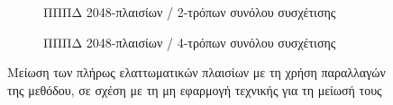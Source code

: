 \begin{figure}[!t]
    \centering
    \begin{subfigure}[t]{\textwidth}
        \centering
        \caption{ΠΠΠΔ 2048-πλαισίων / 2-τρόπων συνόλου συσχέτισης}
        \label{fig:chap5_btb_ffsets_2048_2way}
    \end{subfigure}
    
    \begin{subfigure}[t]{\textwidth}
        \centering
        \caption{ΠΠΠΔ 2048-πλαισίων / 4-τρόπων συνόλου συσχέτισης}
        \label{fig:chap5_btb_ffsets_2048_4way}
    \end{subfigure}
    \caption{Μείωση των πλήρως ελαττωματικών πλαισίων με τη χρήση παραλλαγών της μεθόδου, σε σχέση με τη μη εφαρμογή τεχνικής για τη μείωσή τους}
    \label{fig:chap5_btb_ffsets_2048}
\end{figure}

